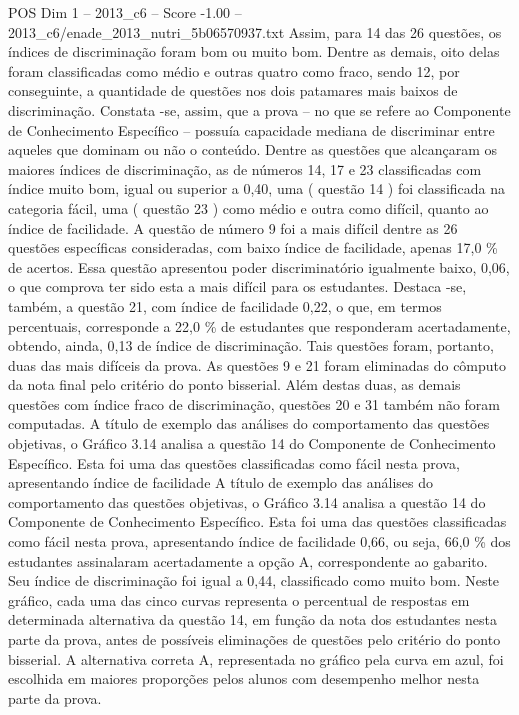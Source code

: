 \begin{textsample}{POS Dim 1 – 2013\_c6 – Score -1.00 – 2013\_c6/enade\_2013\_nutri\_5b06570937.txt}
Assim, para 14 das 26 questões, os índices de discriminação foram bom ou muito bom.
Dentre as demais, oito delas foram classificadas como médio e outras quatro como fraco, sendo 12, por conseguinte, a quantidade de questões nos dois patamares mais baixos de discriminação.
Constata -se, assim, que a prova – no que se refere ao Componente de Conhecimento Específico – possuía capacidade mediana de discriminar entre aqueles que dominam ou não o conteúdo.
Dentre as questões que alcançaram os maiores índices de discriminação, as de números 14, 17 e 23 classificadas com índice muito bom, igual ou superior a 0,40, uma ( questão 14 ) foi classificada na categoria fácil, uma ( questão 23 ) como médio e outra como difícil, quanto ao índice de facilidade.
A questão de número 9 foi a mais difícil dentre as 26 questões específicas consideradas, com baixo índice de facilidade, apenas 17,0 \% de acertos.
Essa questão apresentou poder discriminatório igualmente baixo, 0,06, o que comprova ter sido esta a mais difícil para os estudantes.
Destaca -se, também, a questão 21, com índice de facilidade 0,22, o que, em termos percentuais, corresponde a 22,0 \% de estudantes que responderam acertadamente, obtendo, ainda, 0,13 de índice de discriminação.
Tais questões foram, portanto, duas das mais difíceis da prova.
As questões 9 e 21 foram eliminadas do cômputo da nota final pelo critério do ponto bisserial.
Além destas duas, as demais questões com índice fraco de discriminação, questões 20 e 31 também não foram computadas.
A título de exemplo das análises do comportamento das questões objetivas, o Gráfico 3.14 analisa a questão 14 do Componente de Conhecimento Específico.
Esta foi uma das questões classificadas como fácil nesta prova, apresentando índice de facilidade A título de exemplo das análises do comportamento das questões objetivas, o Gráfico 3.14 analisa a questão 14 do Componente de Conhecimento Específico.
Esta foi uma das questões classificadas como fácil nesta prova, apresentando índice de facilidade 0,66, ou seja, 66,0 \% dos estudantes assinalaram acertadamente a opção A, correspondente ao gabarito.
Seu índice de discriminação foi igual a 0,44, classificado como muito bom.
Neste gráfico, cada uma das cinco curvas representa o percentual de respostas em determinada alternativa da questão 14, em função da nota dos estudantes nesta parte da prova, antes de possíveis eliminações de questões pelo critério do ponto bisserial.
A alternativa correta A, representada no gráfico pela curva em azul, foi escolhida em maiores proporções pelos alunos com desempenho melhor nesta parte da prova.

\end{textsample}
